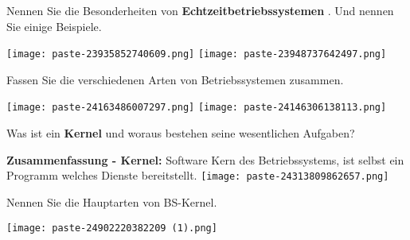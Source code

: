 \documentclass{article}
\begin{document}
\begin{tcolorbox}[colback=white!10!white,colframe=lightgray!75!black,
  savelowerto=\jobname_ex.tex]

\begin{center}
Nennen Sie die Besonderheiten von 
\textbf{Echtzeitbetriebssystemen
}. Und nennen Sie einige Beispiele.

\end{center}

\tcblower

\justifying
\texttt{[image: paste-23935852740609.png]}
\texttt{[image: paste-23948737642497.png]}

\end{tcolorbox}
\begin{tcolorbox}[colback=white!10!white,colframe=lightgray!75!black,
  savelowerto=\jobname_ex.tex]

\begin{center}
Fassen Sie die verschiedenen Arten von Betriebssystemen zusammen.

\end{center}

\tcblower

\justifying
\texttt{[image: paste-24163486007297.png]}
\texttt{[image: paste-24146306138113.png]}

\end{tcolorbox}
\begin{tcolorbox}[colback=white!10!white,colframe=lightgray!75!black,
  savelowerto=\jobname_ex.tex]

\begin{center}
Was ist ein 
\textbf{Kernel
}und woraus bestehen seine wesentlichen Aufgaben?

\end{center}

\tcblower

\justifying
\textbf{Zusammenfassung - Kernel:
}Software Kern des Betriebssystems, ist selbst ein Programm welches Dienste bereitstellt.
\texttt{[image: paste-24313809862657.png]}

\end{tcolorbox}
\begin{tcolorbox}[colback=white!10!white,colframe=lightgray!75!black,
  savelowerto=\jobname_ex.tex]

\begin{center}
Nennen Sie die Hauptarten von BS-Kernel.

\end{center}

\tcblower

\justifying
\texttt{[image: paste-24902220382209 (1).png]}

\end{tcolorbox}
\end{document}

